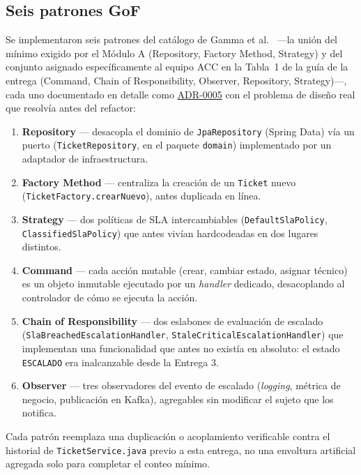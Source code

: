 \subsection{Seis patrones GoF}
\label{sec:gof-e4}

Se implementaron seis patrones del catálogo de Gamma et al.~\cite{gamma1994patterns} —la unión
del mínimo exigido por el Módulo A (Repository, Factory Method, Strategy) y del conjunto
asignado específicamente al equipo ACC en la Tabla~1 de la guía de la entrega (Command, Chain of
Responsibility, Observer, Repository, Strategy)—, cada uno documentado en detalle como
\href{run:../adr/0005-patrones-gof.md}{ADR-0005} con el problema de diseño real que resolvía
antes del refactor:

\begin{enumerate}[nosep]
  \item \textbf{Repository} --- desacopla el dominio de \texttt{JpaRepository} (Spring Data) vía
        un puerto (\texttt{TicketRepository}, en el paquete \texttt{domain}) implementado por un
        adaptador de infraestructura.
  \item \textbf{Factory Method} --- centraliza la creación de un \texttt{Ticket} nuevo
        (\texttt{TicketFactory.crearNuevo}), antes duplicada en línea.
  \item \textbf{Strategy} --- dos políticas de SLA intercambiables (\texttt{DefaultSlaPolicy},
        \texttt{ClassifiedSlaPolicy}) que antes vivían hardcodeadas en dos lugares distintos.
  \item \textbf{Command} --- cada acción mutable (crear, cambiar estado, asignar técnico) es un
        objeto inmutable ejecutado por un \emph{handler} dedicado, desacoplando al controlador de
        cómo se ejecuta la acción.
  \item \textbf{Chain of Responsibility} --- dos eslabones de evaluación de escalado
        (\texttt{SlaBreachedEscalationHandler}, \texttt{StaleCriticalEscalationHandler}) que
        implementan una funcionalidad que antes no existía en absoluto: el estado
        \texttt{ESCALADO} era inalcanzable desde la Entrega 3.
  \item \textbf{Observer} --- tres observadores del evento de escalado (\emph{logging}, métrica de
        negocio, publicación en Kafka), agregables sin modificar el sujeto que los notifica.
\end{enumerate}

Cada patrón reemplaza una duplicación o acoplamiento verificable contra el historial de
\texttt{TicketService.java} previo a esta entrega, no una envoltura artificial agregada solo para
completar el conteo mínimo.

